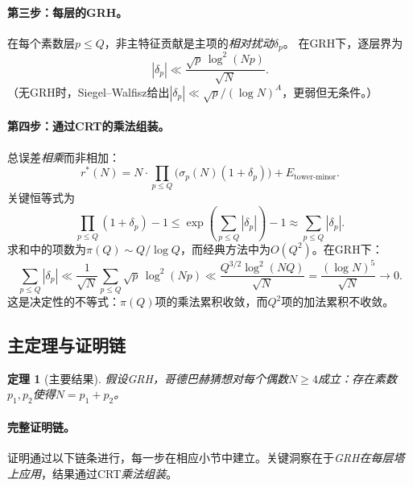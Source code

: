 \documentclass[11pt,a4paper]{article}
\newtheorem{theorem}{定理}[section]
\theoremstyle{remark}
\begin{document}
\paragraph{第三步：每层的GRH。}
在每个素数层$p \leq Q$，非主特征贡献是主项的\emph{相对扰动}$\delta_p$。
在GRH下，逐层界为
\begin{equation}
\label{eq:per-layer-GRH}
  |\delta_p| \ll \frac{\sqrt{p}\,\log^2(Np)}{\sqrt{N}}.
\end{equation}
（无GRH时，Siegel--Walfisz给出$|\delta_p| \ll \sqrt{p}/(\log N)^A$，更弱但无条件。）

\paragraph{第四步：通过CRT的乘法组装。}
总误差\emph{相乘}而非相加：
\begin{equation}
\label{eq:multiplicative-error}
  r^*(N) = N \cdot \prod_{p \leq Q}\bigl(\sigma_p(N)(1 + \delta_p)\bigr)
    + E_{\text{tower-minor}}.
\end{equation}
关键恒等式为
\begin{equation}
\label{eq:product-to-sum}
  \prod_{p \leq Q}(1+\delta_p) - 1
  \leq \exp\!\left(\sum_{p \leq Q}|\delta_p|\right) - 1
  \approx \sum_{p \leq Q}|\delta_p|.
\end{equation}
求和中的项数为$\pi(Q) \sim Q/\log Q$，而经典方法中为$O(Q^2)$。在GRH下：
\begin{equation}
\label{eq:GRH-sum}
  \sum_{p \leq Q}|\delta_p|
  \ll \frac{1}{\sqrt{N}}\sum_{p \leq Q}\sqrt{p}\,\log^2(Np)
  \ll \frac{Q^{3/2}\log^2(NQ)}{\sqrt{N}}
  = \frac{(\log N)^5}{\sqrt{N}} \to 0.
\end{equation}
这是决定性的不等式：$\pi(Q)$项的乘法累积收敛，而$Q^2$项的加法累积不收敛。

\subsection{主定理与证明链}

\begin{theorem}[主要结果]
\label{thm:main}
假设GRH，哥德巴赫猜想对每个偶数$N \geq 4$成立：存在素数$p_1, p_2$使得$N = p_1 + p_2$。
\end{theorem}

\paragraph{完整证明链。}
证明通过以下链条进行，每一步在相应小节中建立。关键洞察在于\emph{GRH在每层塔上应用}，结果通过CRT\emph{乘法组装}。
\end{document}

